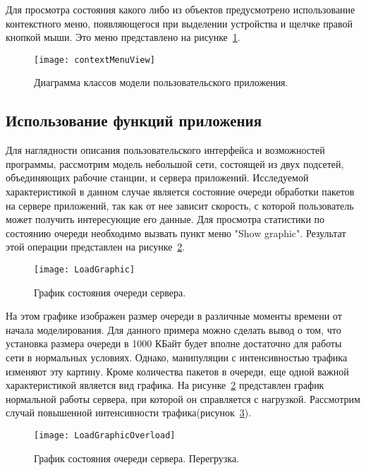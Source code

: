     Для просмотра состояния какого либо из объектов предусмотрено использование контекстного меню, появляющегося при выделении устройства и щелчке правой кнопкой мыши. Это меню представлено на рисунке~\ref{Pic11}.

    \begin{figure}[h!]\center
        \texttt{[image: contextMenuView]}
        \caption{Диаграмма классов модели пользовательского приложения. } \label{Pic11}
    \end{figure}

    \subsection{Использование функций приложения}

    Для наглядности описания пользовательского интерфейса и возможностей программы, рассмотрим модель небольшой сети, состоящей из двух подсетей, объединяющих рабочие станции,  и сервера приложений. Исследуемой характеристикой в данном случае является состояние очереди обработки пакетов на сервере приложений, так как от нее зависит скорость, с которой пользователь может получить интересующие его данные. Для просмотра статистики по состоянию очереди необходимо вызвать пункт меню "Show graphic". Результат этой операции представлен на рисунке~\ref{Pic12}.

    \begin{figure}[h!]\center
        \texttt{[image: LoadGraphic]}
        \caption{График состояния очереди сервера. } \label{Pic12}
    \end{figure}

    На этом графике изображен размер очереди в различные моменты времени от начала моделирования. Для данного примера можно сделать вывод о том, что установка размера очереди в 1000 КБайт будет вполне достаточно для работы сети в нормальных условиях. Однако, манипуляции с интенсивностью трафика изменяют эту картину. Кроме количества пакетов в очереди, еще одной важной характеристикой является вид графика. На рисунке~\ref{Pic12} представлен график нормальной работы сервера, при
    которой он справляется с нагрузкой. Рассмотрим случай повышенной интенсивности трафика(рисунок~\ref{Pic13}).

    \begin{figure}[h!]\center
        \texttt{[image: LoadGraphicOverload]}
        \caption{График состояния очереди сервера. Перегрузка. } \label{Pic13}
    \end{figure}

